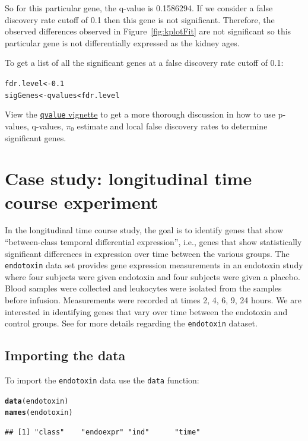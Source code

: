 \documentclass{article}\usepackage[]{graphicx}\usepackage[]{color}
\makeatletter
\newcommand{\hlnum}[1]{\textcolor[rgb]{0.686,0.059,0.569}{#1}}%
\newcommand{\hlopt}[1]{\textcolor[rgb]{0,0,0}{#1}}%
\newcommand{\hlstd}[1]{\textcolor[rgb]{0.345,0.345,0.345}{#1}}%
\newcommand{\hlkwb}[1]{\textcolor[rgb]{0.69,0.353,0.396}{#1}}%
\newcommand{\hlkwd}[1]{\textcolor[rgb]{0.737,0.353,0.396}{\textbf{#1}}}%
\newenvironment{kframe}{%
 \def\at@end@of@kframe{}%
 \ifinner\ifhmode%
  \def\at@end@of@kframe{\end{minipage}}%
  \begin{minipage}{\columnwidth}%
 \fi\fi%
 \def\FrameCommand##1{\hskip\@totalleftmargin \hskip-\fboxsep
 \colorbox{shadecolor}{##1}\hskip-\fboxsep
     \hskip-\linewidth \hskip-\@totalleftmargin \hskip\columnwidth}%
 \MakeFramed {\advance\hsize-\width
   \@totalleftmargin\z@ \linewidth\hsize
   \@setminipage}}%
 {\par\unskip\endMakeFramed%
 \at@end@of@kframe}
\newenvironment{knitrout}{}{} %
\makeatother
\begin{document}
So for this particular gene, the q-value is 0.1586294. If we consider a false discovery rate cutoff of 0.1 then this gene is not significant. Therefore, the observed differences observed in Figure~\ref{fig:kplotFit} are not significant so this particular gene is not differentially expressed as the kidney ages. 

To get a list of all the significant genes at a false discovery rate cutoff of 0.1:
\begin{knitrout}
\color{fgcolor}\begin{kframe}
\begin{alltt}
\hlstd{fdr.level} \hlkwb{<-} \hlnum{0.1}
\hlstd{sigGenes} \hlkwb{<-} \hlstd{qvalues} \hlopt{<} \hlstd{fdr.level}
\end{alltt}
\end{kframe}
\end{knitrout}

View the \href{http://www.bioconductor.org/packages/release/bioc/html/qvalue.html}{{\tt qvalue} vignette} to get a more thorough discussion in how to use p-values, q-values, $\pi_{0}$ estimate and local false discovery rates to determine significant genes.

\section{Case study: longitudinal time course experiment}
\label{sec:endotoxin}
In the longitudinal time course study, the goal is to identify genes that show ``between-class temporal differential expression'', i.e., genes that show statistically significant differences in expression over time between the various groups. The {\tt endotoxin} data set provides gene expression measurements in an endotoxin study where four subjects were given endotoxin and four subjects were given a placebo. Blood samples were collected and leukocytes were isolated from the samples before infusion. Measurements were recorded at times 2, 4, 6, 9, 24 hours. We are interested in identifying genes that vary over time between the endotoxin and control groups. See \cite{calvano:2005} for more details regarding the {\tt endotoxin} dataset.

\subsection{Importing the data}
To import the {\tt endotoxin} data use the {\tt data} function:
\begin{knitrout}
\color{fgcolor}\begin{kframe}
\begin{alltt}
\hlkwd{data}\hlstd{(endotoxin)}
\hlkwd{names}\hlstd{(endotoxin)}
\end{alltt}
\begin{verbatim}
## [1] "class"    "endoexpr" "ind"      "time"
\end{verbatim}
\end{kframe}
\end{knitrout}
\end{document}
